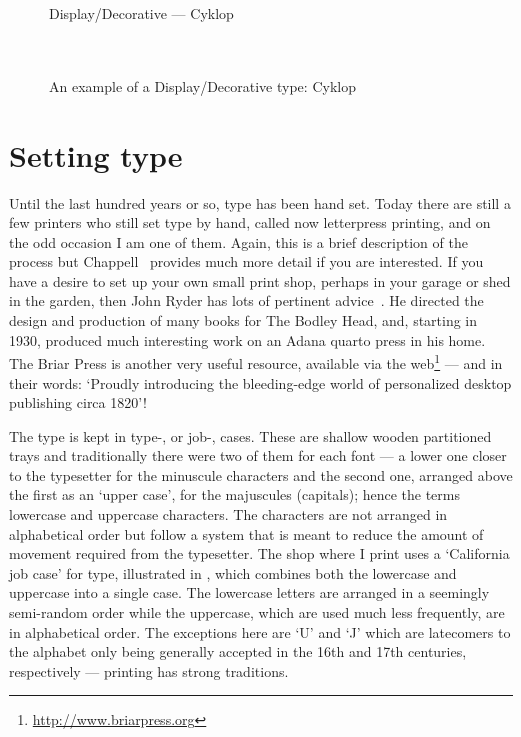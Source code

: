 \documentclass[10pt,a4paper,oneside,extrafontsizes]{memoir}%
\newcommand{\PWnote}[2]{}
\begin{document}
\begin{figure}
\centering
{\centering{}\selectfont
  Display/Decorative --- Cyklop \\
  \UCalphabet \\
  \LCalphabet \\
  \fox\par}
\caption{An example of a Display/Decorative type: Cyklop} 
   \label{fig:cyklop}
\end{figure}

\section{Setting type}

\PWnote{2009/04/03}{Added bits and pieces about letterpress.}

\begin{paracol}{2}
\switchEng
   Until the last hundred years or so, type has been hand set. Today there
are still a few printers who still set type by hand, called 
now letterpress printing, and on the odd occasion I am 
one of them. Again, this is a brief description of the process but 
Chappell~\autocite{CHAPPELL99}
provides much more detail if you are interested. If you have a desire to
set up your own small print shop, perhaps in your garage or shed in the garden,
then John Ryder has lots of pertinent advice~\autocite{RYDER}. 
He directed
the design and production of many books for The Bodley Head, and, starting in
1930, produced much interesting work on an Adana 
quarto press in his home.
The Briar Press is another very useful resource, 
available via the web\label{briar}\footnote{\url{http://www.briarpress.org}} 
--- and in their words: `Proudly
introducing the bleeding-edge world of personalized desktop publishing
circa 1820'!

    The type is kept in type-, or job-, cases. 
These are shallow wooden 
partitioned trays and traditionally there were two of them for each font --- 
a lower one closer to the typesetter for the minuscule characters and the 
second one, arranged above the first as an `upper case', for the majuscules
(capitals); hence the terms lowercase and uppercase characters. The
characters are not arranged in alphabetical order but follow a system
that is meant to reduce the amount of movement required from the typesetter.
The shop where I print uses a `California job case' for type, 
illustrated in , which combines both the lowercase and 
uppercase into a single case. The lowercase letters are arranged in a 
seemingly semi-random order while the uppercase, which are used much less
frequently, are in alphabetical order. The exceptions here are `U' and `J' 
which are latecomers to the alphabet only being generally accepted in the 16th
and 17th centuries, respectively --- printing has strong traditions.
\end{paracol}
\end{document}
